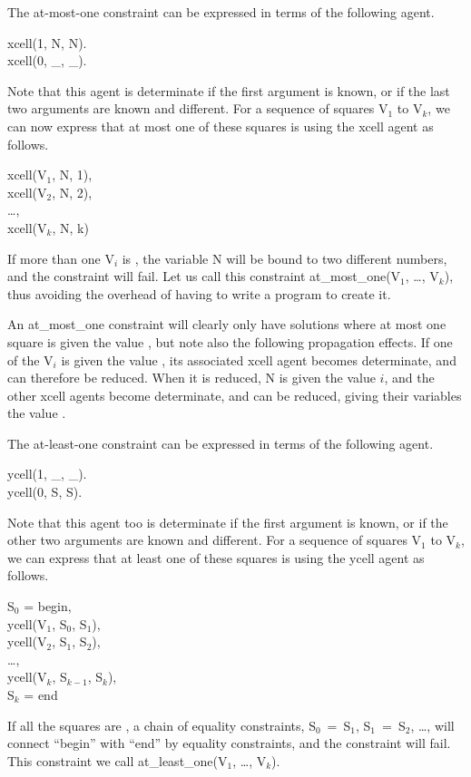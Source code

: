 The at-most-one constraint can be expressed in terms of the following
agent.
%
\begin{program}
xcell(1, N, N).  \\
xcell(0, _, _).
\end{program}%
%
Note that this agent is determinate if the first argument is known, or
if the last two arguments are known and different.  For a sequence of
squares {\prog V$_1$} to {\prog V$_k$,} we can now express that at most one
of these squares is {} using the {\prog xcell} agent as follows.
%
\begin{progex}
xcell(V$_1$, N, 1), \\
xcell(V$_2$, N, 2), \\
\dots, \\
xcell(V$_k$, N, k)
\end{progex}%
%
If more than one {\prog V$_i$} is {}, the variable {\prog N}
will be bound to two different numbers, and the constraint will fail.
Let us call this constraint {\prog at_most_one(V$_1$, \dots, V$_k$)}, thus
avoiding the overhead of having to write a program to create it.

An {\prog at_most_one constraint} will clearly only have solutions
where at most one square is given the value {}, but note also
the following propagation effects.  If one of the {\prog V$_i$} is
given the value {}, its associated {\prog xcell} agent becomes
determinate, and can therefore be reduced.  When it is reduced, {\prog
N} is given the value $i$, and the other xcell agents become
determinate, and can be reduced, giving their variables the value
{}.

The at-least-one constraint can be expressed in terms of the following
agent.
%
\begin{program}
ycell(1, _, _).  \\
ycell(0, S, S).
\end{program}%
%
Note that this agent too is determinate if the first argument is
known, or if the other two arguments are known and different.  For a
sequence of squares {\prog V$_1$} to {\prog V$_k$}, we can express that at
least one of these squares is {} using the {\prog ycell} agent
as follows.
%
\begin{progex}
S$_0$ = begin, \\
ycell(V$_1$, S$_0$, S$_1$), \\
ycell(V$_2$, S$_1$, S$_2$), \\
\dots, \\
ycell(V$_k$, S$_{k-1}$, S$_k$), \\
S$_k$ = end
\end{progex}%
%
If all the squares are {}, a chain of equality constraints,
{\prog S$_0$~=~S$_1$}, {\prog S$_1$~=~S$_2$,} \dots, will connect
``{\prog begin}'' with ``{\prog end}'' by equality constraints, and
the constraint will fail.  This constraint we call {\prog
at_least_one(V$_1$, \dots, V$_k$)}.

